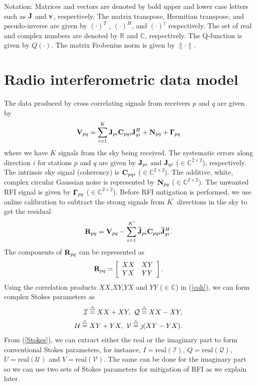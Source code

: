 \documentclass[conference]{IEEEtran}
\newcommand{\beq}{\begin{equation}}
\newcommand{\eeq}{\end{equation}}
\newcommand{\beqn}{\begin{eqnarray}}
\newcommand{\eeqn}{\end{eqnarray}}
\def\bmath#1{\mbox{\boldmath$#1$}}
\begin{document}
Notation: Matrices and vectors are denoted by bold upper and lower case letters such as ${\bf J}$ and ${\bf v}$, respectively. The matrix transpose, Hermitian transpose, and pseudo-inverse are given by $(\cdot)^T$ , $(\cdot)^H$, and $(\cdot)^\dagger$ respectively. The set of real and complex numbers are denoted by  ${\mathbb R}$ and ${\mathbb C}$, respectively. The Q-function is given by $Q(\cdot)$. The matrix  Frobenius norm is given by $\|\cdot \|$.

\section{Radio interferometric data model}\label{sec:model}
The data produced by cross correlating signals from receivers $p$ and $q$ are given by \cite{HBS}
\beq
\label{V}
{\bf V}_{pq}=\sum_{i=1}^K {\bf J}_{pi} {\bf C}_{pqi} {\bf J}_{qi}^H + {\bf N}_{pq} + {\bmath \Gamma}_{pq}
\eeq
where we have $K$ signals from the sky being received. The systematic errors along direction $i$ for stations $p$ and $q$ are given by ${\bf J}_{pi}$ and ${\bf J}_{qi}$ ($\in {\mathbb C}^{2\times 2}$), respectively. The intrinsic sky signal (coherency) is ${\bf C}_{pqi}$ ($\in {\mathbb C}^{2\times 2}$). The additive, white, complex circular Gaussian noise is represented by ${\bf N}_{pq}$ ($\in {\mathbb C}^{2\times 2}$). The unwanted RFI signal is given by ${\bmath \Gamma}_{pq}$ ($\in {\mathbb C}^{2\times 2}$). Before RFI mitigation is performed, we use online calibration \cite{DSW2019} to subtract the strong signals from $K^\prime$ directions in the sky to get the residual
\beq
\label{R}
{\bf R}_{pq}={\bf V}_{pq}-\sum_{i=1}^{K^\prime} \widehat{\bf J}_{pi} {\bf C}_{pqi} \widehat{\bf J}_{qi}^H. 
\eeq
The components of ${\bf R}_{pq}$ can be represented as
\beq \label{coh}
{\bf { R}}_{pq}=\left[ \begin{array}{cc}
XX& XY\\
YX & YY 
\end{array} \right].
\eeq
Using the correlation products $XX$,$XY$,$YX$ and $YY$ ($\in {\mathbb C}$) in (\ref{coh}), we can form complex Stokes parameters as
\beqn \label{Stokes}
\mathcal{I}\buildrel\triangle\over=XX+XY,\ \mathcal{Q} \buildrel\triangle\over=XX-XY,\\\nonumber
\mathcal{U} \buildrel\triangle\over=XY+YX,\ \mathcal{V} \buildrel\triangle\over=\jmath(XY-YX).
\eeqn
From (\ref{Stokes}), we can extract either the real or the imaginary part to form conventional Stokes parameters, for instance, $I=\mathrm{real}(\mathcal{I})$, $Q=\mathrm{real}(\mathcal{Q})$, $U=\mathrm{real}(\mathcal{U})$ and $V=\mathrm{real}(\mathcal{V})$. The same can be done for the imaginary part so we can use two sets of Stokes parameters for mitigation of RFI as we explain later.
\end{document}
